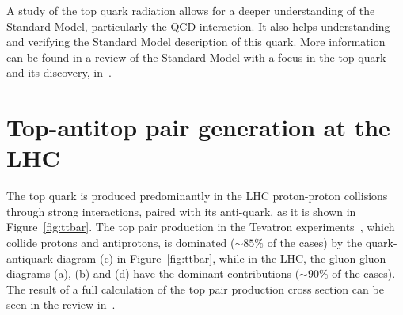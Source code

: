 A study of the top quark radiation allows for a deeper
understanding of the Standard Model, particularly the QCD interaction. It also helps understanding and verifying the Standard Model description of this
quark.
More information can be found in a review of the Standard Model with a focus in the top quark and its discovery, in~\cite{Incandela:2009pf}.

\section{Top-antitop pair generation at the LHC}

The top quark is produced predominantly in the LHC proton-proton collisions through
strong interactions, paired with its anti-quark, as it is shown in Figure~\ref{fig:ttbar}.
The top pair production in the Tevatron experiments~\cite{top_tevatron,PhysRevLett.74.2626,PhysRevLett.74.2632}, which
collide protons and antiprotons, is dominated ($\sim 85\%$ of the cases) by
the quark-antiquark diagram (c) in Figure~\ref{fig:ttbar}, while in the LHC, the gluon-gluon diagrams (a), (b) and (d) have the dominant
contributions ($\sim 90\%$ of the cases).
The result of a full calculation of the top pair production cross
section can be seen in the review in~\cite{topreview_wagner}.

